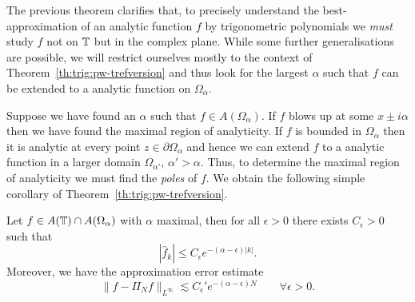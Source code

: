 The previous theorem clarifies that, to precisely understand the
best-approximation of an analytic function $f$ by  trigonometric polynomials
we {\em must} study $f$ not on $\mathbb{T}$ but in the complex plane. While some
further generalisations are possible, we will restrict ourselves mostly
to the context of Theorem~\ref{th:trig:pw-trefversion} and thus look for the
largest $\alpha$ such that $f$ can be extended to a analytic function
on $\Omega_\alpha$.

Suppose we have found an $\alpha$ such that $f \in A(\Omega_\alpha)$. If $f$
blows up at some $x \pm i \alpha$ then we have found the maximal region of
analyticity. If $f$ is bounded in $\Omega_\alpha$ then it is analytic at every
point $z \in \partial \Omega_\alpha$ and hence we can extend $f$ to a
analytic function in a larger domain $\Omega_{\alpha'}$, $\alpha' > \alpha$.
Thus, to determine the maximal region of analyticity we must find the {\em
poles} of $f$. We obtain the following simple corollary of Theorem~\ref{th:trig:pw-trefversion}.

\begin{corollary} \label{th:trig:pw-sharp}
  Let $f \in A(\mathbb{T}) \cap A(\Omega_\alpha)$ with $\alpha$ maximal, then
  for all $\epsilon > 0$ there exists $C_\epsilon > 0$ such that
  \[
    |\hat{f}_k| \leq C_\epsilon e^{- (\alpha-\epsilon) |k|}.
  \]
  Moreover, we have the approximation error estimate
  \[
    \| f - \Pi_N f \|_{L^\infty} \lesssim C_\epsilon' e^{-(\alpha-\epsilon) N}
    \qquad \forall \epsilon > 0.
  \]
\end{corollary}


